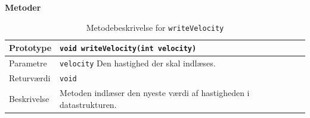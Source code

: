\textbf{Metoder}

\begin{table}[h]
\begin{tabularx}{\textwidth}{| L{2.5 cm} | Z |} \hline
Prototype & \texttt{void writeVelocity(int velocity)} \\\hline
Parametre & \texttt{velocity} \newline Den hastighed der skal indlæses. \\\hline
Returværdi &  \texttt{void} \newline \\\hline
Beskrivelse & Metoden indlæser den nyeste værdi af hastigheden i datastrukturen. \\\hline
\end{tabularx}
\caption{Metodebeskrivelse for \texttt{writeVelocity}}
\label{table:met_writeVelocity}
\end{table}
\clearpage

